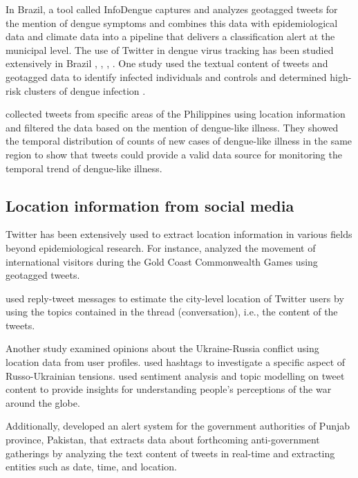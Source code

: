 In Brazil, a tool called InfoDengue \cite{codeco_infodengue_2018} captures and analyzes geotagged tweets for the mention of dengue symptoms and combines this data with epidemiological data and climate data into a pipeline that delivers a classification alert at the municipal level. The use of Twitter in dengue virus tracking has been studied extensively in Brazil \cite{gomide_dengue_2011}, \cite{jordan_using_2018}, \cite{saire_building_2019}, \cite{albinati_enhancement_2017}. One study used the textual content of tweets and geotagged data to identify infected individuals and controls and determined high-risk clusters of dengue infection \cite{souza_identifying_2019}.

\cite{coberly_tweeting_2014} collected tweets from specific areas of the Philippines using location information and filtered the data based on the mention of dengue-like illness. They showed the temporal distribution of counts of new cases of dengue-like illness in the same region to show that tweets could provide a valid data source for monitoring the temporal trend of dengue-like illness. 

\subsection{Location information from social media}

Twitter has been extensively used to extract location information in various fields beyond epidemiological research. For instance, \cite{jin_communicating_2020} analyzed the movement of international visitors during the Gold Coast Commonwealth Games using geotagged tweets. 

\cite{chandra_estimating_2011} used reply-tweet messages to estimate the city-level location of Twitter users by using the topics contained in the thread (conversation), i.e., the content of the tweets.

Another study examined opinions about the Ukraine-Russia conflict using location data from user profiles. \cite{makhortykh_savedonbasspeople_2015} used hashtags to investigate a specific aspect of Russo-Ukrainian tensions. \cite{sazzed_dynamics_2022} used sentiment analysis and topic modelling on tweet content to provide insights for understanding people's perceptions of the war around the globe.

Additionally, \cite{malik_crowd_2023} developed an alert system for the government authorities of Punjab province, Pakistan, that extracts data about forthcoming anti-government gatherings by analyzing the text content of tweets in real-time and extracting entities such as date, time, and location.

